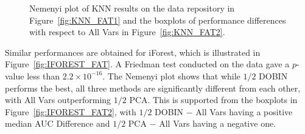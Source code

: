 \documentclass[a4paper,12pt]{article}
\begin{document}
\begin{figure}[!ht]
	\centering
	\hfill
	\caption{Nemenyi plot of KNN results on the data repository in Figure~\ref{fig:KNN_FAT1} and the boxplots of performance differences with respect to All Vars in Figure~\ref{fig:KNN_FAT2}.}
	\label{fig:KNN_FAT}
\end{figure}

Similar performances are obtained for iForest, which is illustrated in Figure~\ref{fig:IFOREST_FAT}. A Friedman test conducted on the data gave a $p$-value less than $2.2 \times 10^{-16}$. The Nemenyi plot shows that while $1/2$ DOBIN performs the best, all three methods are significantly different from each other, with All Vars outperforming $1/2$ PCA. This is supported from the boxplots in Figure~\ref{fig:IFOREST_FAT2}, with $1/2$ DOBIN $-$ All Vars having a positive median AUC Difference and  $1/2$ PCA $-$ All Vars having a negative one.

\end{document}
